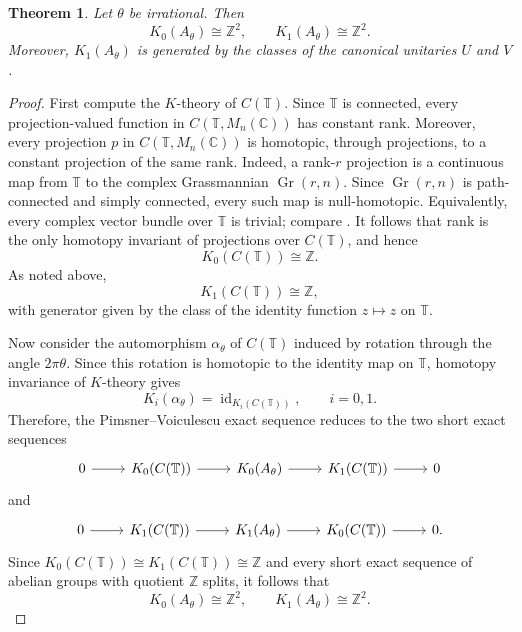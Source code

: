 \documentclass{book}
\newtheorem{theorem}[definition]{Theorem}
\begin{document}
\begin{theorem}\label{thm:K-theory-rotation-algebra}
  Let \(\theta\) be irrational. Then
  \[
    K_0(A_\theta)\cong\mathbb{Z}^2,
    \qquad
    K_1(A_\theta)\cong\mathbb{Z}^2.
  \]
  Moreover, \(K_1(A_\theta)\) is generated by the classes of the
    canonical unitaries \(U\) and \(V\).
\end{theorem}
\begin{proof}
  First compute the \(K\)-theory of \(C(\mathbb{T})\).
Since \(\mathbb{T}\) is connected, every projection-valued function in
\(C(\mathbb{T},M_n(\mathbb{C}))\) has constant rank. Moreover, every
projection \(p\) in \(C(\mathbb{T},M_n(\mathbb{C}))\) is homotopic,
through projections, to a constant projection of the same rank.
Indeed, a rank-\(r\) projection is a continuous map from \(\mathbb T\) to
the complex Grassmannian \(\operatorname{Gr}(r,n)\). Since
\(\operatorname{Gr}(r,n)\) is path-connected and simply connected, every
such map is null-homotopic. Equivalently, every complex vector bundle over
\(\mathbb T\) is trivial; compare
\cite[Example~VIII.5.2]{Davidson1996}.
It follows that rank is the only homotopy invariant of projections over
\(C(\mathbb{T})\), and hence
\[
  K_0(C(\mathbb{T}))\cong\mathbb{Z}.
\]
As noted above,
\[
  K_1(C(\mathbb{T}))\cong\mathbb{Z},
\]
with generator given by the class of the identity function
\(z\mapsto z\) on \(\mathbb{T}\).\par

Now consider the automorphism \(\alpha_\theta\) of \(C(\mathbb{T})\)
induced by rotation through the angle \(2\pi\theta\). Since this rotation
is homotopic to the identity map on \(\mathbb{T}\), homotopy invariance
of \(K\)-theory gives
\[
  K_i(\alpha_\theta)=\operatorname{id}_{K_i(C(\mathbb{T}))},
  \qquad i=0,1.
\]
Therefore, the Pimsner--Voiculescu exact sequence reduces to the two
short exact sequences
\[
  \begin{tikzcd}
    0\arrow[r]
      &K_0(C(\mathbb{T}))\arrow[r]
      &K_0(A_\theta)\arrow[r]
      &K_1(C(\mathbb{T}))\arrow[r]
      &0
  \end{tikzcd}
\]
and
\[
  \begin{tikzcd}
    0\arrow[r]
      &K_1(C(\mathbb{T}))\arrow[r]
      &K_1(A_\theta)\arrow[r]
      &K_0(C(\mathbb{T}))\arrow[r]
      &0.
  \end{tikzcd}
\]
Since \(K_0(C(\mathbb{T}))\cong K_1(C(\mathbb{T}))\cong\mathbb{Z}\)
and every short exact sequence of abelian groups with quotient
\(\mathbb{Z}\) splits, it follows that
\[
  K_0(A_\theta)\cong\mathbb{Z}^2,
  \qquad
  K_1(A_\theta)\cong\mathbb{Z}^2.
\]


\end{proof}
\end{document}
